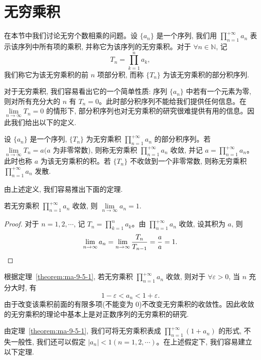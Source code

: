 \section{无穷乘积}
\label{sec:ma-9-5}

在本节中我们讨论无穷个数相乘的问题。设 $\{a_n\}$ 是一个序列, 我们用 $\prod\limits_{n=1}^{+\infty}a_n$ 表示该序列中所有项的乘积, 并称它为该序列的无穷乘积。对于 $\forall n\in\mathbb{N}$, 记
\[
  T_n=\prod_{k=1}^n a_k,
\]
我们称它为该无穷乘积的前 $n$ 项部分积, 而称 $\{T_n\}$ 为该无穷乘积的部分积序列.

对于无穷乘积, 我们容易看出它的一个简单性质: 序列 $\{a_n\}$ 中若有一个元素为零, 则对所有充分大的 $n$ 有 $T_n=0$。此时部分积序列不能给我们提供任何信息。在 $\lim\limits_{n\to\infty}T_n=0$ 的情形下, 部分积序列也对无穷乘积的研究很难提供有用的信息。因此我们给出以下的定义.

\begin{definition}\label{definition:ma-9-5-1}
设 $\{a_n\}$ 是一个序列, $\{T_n\}$ 为无穷乘积 $\prod\limits_{n=1}^{+\infty}a_n$ 的部分积序列。若 $\lim\limits_{n\to\infty}T_n=a(a$ 为非零常数), 则称无穷乘积 $\prod\limits_{n=1}^{+\infty}a_n$ 收敛, 并记 $a=\prod\limits_{n=1}^{+\infty}a_n$。此时也称 $a$ 为该无穷乘积的积。若 $\{T_n\}$ 不收敛到一个非零常数, 则称无穷乘积 $\prod\limits_{n=1}^{+\infty}a_n$ 发散.
\end{definition}

由上述定义, 我们容易推出下面的定理.

\begin{theorem}\label{theorem:ma-9-5-1}
若无穷乘积 $\prod\limits_{n=1}^{+\infty}a_n$ 收敛, 则 $\lim\limits_{n\to\infty}a_n=1$.
\end{theorem}


\begin{proof}
对于 $n=1,2,\cdots$, 记 $T_n=\prod\limits_{k=1}^n a_k$。由 $\prod\limits_{n=1}^{+\infty}a_n$ 收敛, 设其积为 $a$, 则
\[
  \lim_{n\to\infty}a_n=\lim_{n\to\infty}\frac{T_n}{T_{n-1}}=\frac{a}{a}=1.
\qedhere
\]
\end{proof}


根据定理~\ref{theorem:ma-9-5-1}, 若无穷乘积 $\prod\limits_{n=1}^{+\infty}a_n$ 收敛, 则对于 $\forall\varepsilon>0$, 当 $n$ 充分大时, 有
\[
  1-\varepsilon<a_n<1+\varepsilon.
\]
由于改变该乘积前面的有限多项(不能变为 0)不改变无穷乘积的收敛性。因此收敛的无穷乘积的理论中基本上是对正数序列的无穷乘积的研究.

由定理~\ref{theorem:ma-9-5-1}, 我们可将无穷乘积表成 $\prod\limits_{n=1}^{+\infty}(1+a_n)$ 的形式, 不失一般性, 我们还可以假定 $|a_n|<1(n=1,2,\cdots)$。在上述假定下, 我们容易建立以下定理.

